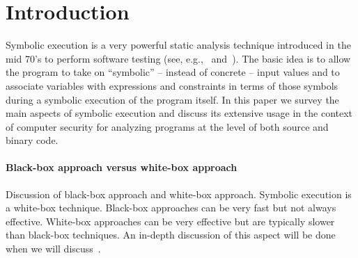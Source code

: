 
\section{Introduction}

Symbolic execution is a very powerful static analysis technique introduced in the mid 70's to perform software testing (see, e.g.,~{\cite{K-CACM76} and~\cite{H-TSE77}}). The basic idea is to allow the program to take on ``symbolic'' -- instead of concrete -- input values and to associate variables with expressions and constraints in terms of those symbols during a symbolic execution of the program itself. In this paper we survey the main aspects of symbolic execution and discuss its extensive usage in the context of computer security for analyzing programs at the level of both source and binary code.

\paragraph{Black-box approach versus white-box approach}

Discussion of black-box approach and white-box approach. Symbolic execution is a white-box technique. Black-box approaches can be very fast but not always effective. White-box approaches can be very effective but are typically slower than black-box techniques. An in-depth discussion of this aspect will be done when we will discuss~\cite{DRILLER-NDSS16}.


